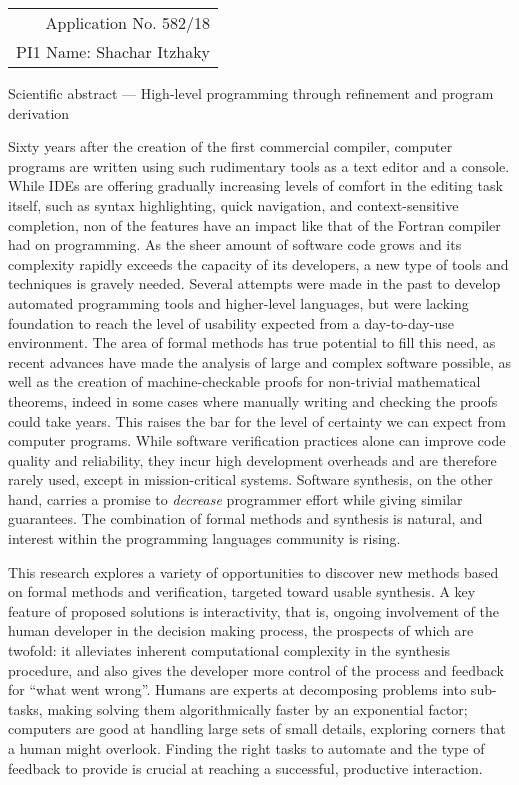\documentclass[11pt]{article}
\begin{document}
\hfill
\begin{tabular}{r}
Application No. 582/18 \\
PI1 Name: Shachar Itzhaky
\end{tabular}

\medskip\noindent
{%
\fontsize{14pt}{14pt}\selectfont%
Scientific abstract --- High-level programming through refinement and program derivation
}

\medskip
Sixty years after the creation of the first commercial compiler,
computer programs are written using such rudimentary tools as a text
editor and a console.
While IDEs are offering gradually increasing levels of comfort in the
editing task itself, such as syntax highlighting, quick navigation,
and context-sensitive completion, non of the features have an impact
like that of the Fortran compiler had on programming.
As the sheer amount of software code grows and its complexity rapidly
exceeds the capacity of its developers, a new type of tools and techniques
is gravely needed.
Several attempts were made in the past to develop automated programming
tools and higher-level languages, but were lacking foundation to
reach the level of usability expected from a day-to-day-use environment.
The area of formal methods has true potential to fill this need, as
recent advances have made the analysis of large and complex software
possible, as well as the creation of machine-checkable proofs for
non-trivial mathematical theorems, indeed in some cases where manually
writing and checking the proofs could take years.
This raises the bar for the level of certainty we can expect from
computer programs.
While software verification practices alone can improve code quality
and reliability, they incur high development overheads and are therefore
rarely used, except in mission-critical systems.
Software synthesis, on the other hand, carries a promise to \emph{decrease}
programmer effort while giving similar guarantees.
The combination of formal methods and synthesis is natural, and interest
within the programming languages community is rising.

This research explores a variety of opportunities to discover new methods
based on formal methods and verification, targeted toward usable synthesis.
A key feature of proposed solutions is interactivity, that is, ongoing
involvement of the human developer in the decision making process,
the prospects of which are twofold:
it alleviates inherent computational complexity in the synthesis procedure,
and also gives the developer more control of the process and feedback for
``what went wrong''.
Humans are experts at decomposing problems into sub-tasks, making solving
them algorithmically faster by an exponential factor;
computers are good at handling large sets of small details, exploring
corners that a human might overlook.
Finding the right tasks to automate and the type of feedback to provide
is crucial at reaching a successful, productive interaction.
\end{document}

